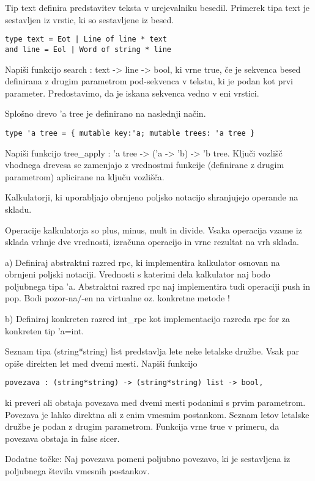 \begin{ex}
  Tip text definira predstavitev teksta v urejevalniku
  besedil. Primerek tipa text je sestavljen iz vrstic, ki so
  sestavljene iz besed.

\begin{verbatim}
type text = Eot | Line of line * text
and line = Eol | Word of string * line
\end{verbatim}

  Napi\v si funkcijo search : text -> line -> bool, ki vrne true, \v
  ce je sekvenca besed definirana z drugim parametrom pod-sekvenca v
  tekstu, ki je podan kot prvi parameter. Predostavimo, da je iskana
  sekvenca vedno v eni vrstici.


\end{ex} 
\begin{ex}
  Splo\v sno drevo 'a tree je definirano na naslednji na\v cin.

\begin{verbatim}
type 'a tree = { mutable key:'a; mutable trees: 'a tree }
\end{verbatim}

  Napi\v si funkcijo tree\_apply : 'a tree -> ('a -> 'b) -> 'b
  tree. Klju\v ci vozli\v s\v c vhodnega drevesa se zamenjajo z
  vrednostmi funkcije (definirane z drugim parametrom) aplicirane na
  klju\v cu vozli\v s\v ca.

\end{ex} 
\begin{ex}
  Kalkulatorji, ki uporabljajo obrnjeno poljsko notacijo shranjujejo
  operande na skladu.

  Operacije kalkulatorja so plus, minus, mult in divide. Vsaka
  operacija vzame iz sklada vrhnje dve vrednosti, izra\v cuna
  operacijo in vrne rezultat na vrh sklada.

  a) Definiraj abstraktni razred rpc, ki implementira kalkulator
  osnovan na obrnjeni poljski notaciji. Vrednosti s katerimi dela
  kalkulator naj bodo poljubnega tipa 'a. Abstraktni razred rpc naj
  implementira tudi operaciji push in pop. Bodi pozor-na/-en na
  virtualne oz. konkretne metode !

  b) Definiraj konkreten razred int\_rpc kot implementacijo razreda
  rpc for za konkreten tip 'a=int.


\end{ex} 
\begin{ex}
  Seznam tipa (string*string) list predstavlja lete neke letalske
  dru\v zbe. Vsak par opi\v se direkten let med dvemi mesti. Napi\v si
  funkcijo

\begin{verbatim}
povezava : (string*string) -> (string*string) list -> bool,
\end{verbatim}

  ki preveri ali obstaja povezava med dvemi mesti podanimi s prvim
  parametrom. Povezava je lahko direktna ali z enim vmesnim
  postankom. Seznam letov letalske dru\v zbe je podan z drugim
  parametrom. Funkcija vrne true v primeru, da povezava obstaja in
  false sicer.

  Dodatne to\v cke: Naj povezava pomeni poljubno povezavo, ki je
  sestavljena iz poljubnega \v stevila vmesnih postankov.


\end{ex} 
